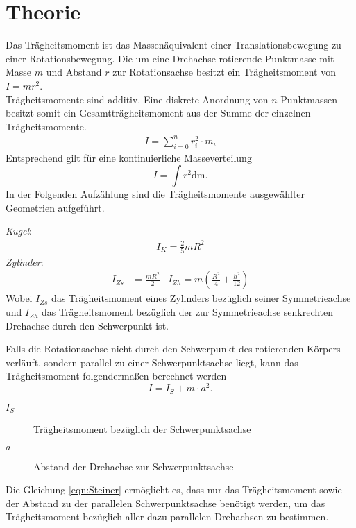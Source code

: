 %
\section{Theorie}
Das Trägheitsmoment ist das Massenäquivalent einer Translationsbewegung zu einer Rotationsbewegung. Die um eine Drehachse rotierende Punktmasse mit Masse $m$ und Abstand $r$ zur Rotationsachse besitzt ein Trägheitsmoment von $I = mr^2$.\\
Trägheitsmomente sind additiv.
Eine diskrete Anordnung von $n$ Punktmassen besitzt somit ein Gesamtträgheitsmoment aus der Summe der einzelnen Trägheitsmomente.
\begin{align}
  I= \sum_{i = 0}^n r_i^2\cdot m_i
\end{align}
Entsprechend gilt für eine kontinuierliche Masseverteilung
\begin{equation}
  \label{eqn:Trägheitsmoment}
  I = \int r^2 \mathup{dm}.
\end{equation}
In der Folgenden Aufzählung sind die Trägheitsmomente ausgewählter Geometrien aufgeführt.

\emph{Kugel}:
\begin{align}
  I_K = \frac{2}{5}mR^2
\end{align}
\emph{Zylinder}:
\begin{align}
  I_{Zs} &= \frac{mR^2}{2} &
  I_{Zh} = m(\frac{R^2}{4} + \frac{h^2}{12})
\end{align}
Wobei $I_{Zs}$ das Trägheitsmoment eines Zylinders bezüglich seiner Symmetrieachse und $I_{Zh}$ das Trägheitsmoment bezüglich der zur Symmetrieachse senkrechten Drehachse durch
den Schwerpunkt ist.

Falls die Rotationsachse nicht durch den Schwerpunkt des rotierenden Körpers verläuft, sondern parallel zu einer Schwerpunktsachse liegt, kann das Trägheitsmoment folgendermaßen
berechnet werden
\begin{equation}
  \label{eqn:Steiner}
  I = I_S + m\cdot a^2.
\end{equation}
\begin{description}
  \item[$I_S$]Trägheitsmoment bezüglich der Schwerpunktsachse
  \item[$a$]Abstand der Drehachse zur Schwerpunktsachse
\end{description}
Die Gleichung \eqref{eqn:Steiner} ermöglicht es, dass nur das Trägheitsmoment sowie der Abstand zu der parallelen Schwerpunktsachse benötigt werden, um das Trägheitsmoment
bezüglich aller dazu parallelen Drehachsen zu bestimmen.
